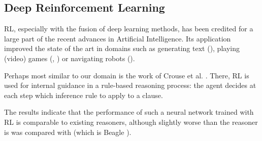 \documentclass[runningheads,a4paper]{llncs}
\begin{document}
\subsection*{Deep Reinforcement Learning}

RL, especially with the fusion of deep learning methods, has been credited for a large part of the recent advances in Artificial Intelligence. Its application improved the state of the art in domains such as generating text (\cite{guoGeneratingTextDeep2015}), playing (video) games (\cite{ohActionConditionalVideoPrediction2015}, \cite{silverMasteringGameGo2017}) or navigating robots (\cite{kahnSelfSupervisedDeepReinforcement2018a}).

Perhaps most similar to our domain is the work of Crouse et al. \cite{crouseDeepReinforcementLearning2020}. There, RL is used for internal guidance in a rule-based reasoning process: the agent decides at each step which inference rule to apply to a clause.

The results indicate that the performance of such a neural network trained with RL is comparable to existing reasoners, although slightly worse than the reasoner is was compared with (which is Beagle \cite{baumgartnerBeagleHierarchicSuperposition2015}).





\end{document}

